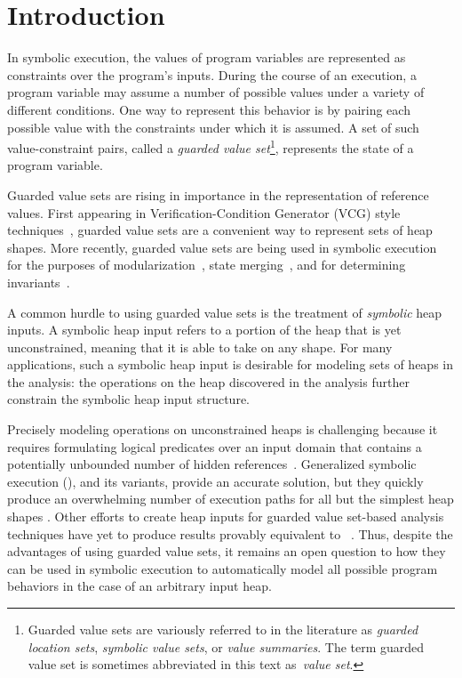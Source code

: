 \section{Introduction}

In symbolic execution, the values of program variables are represented
as constraints over the program's inputs. During the course of an
execution, a program variable may assume a number of possible values
under a variety of different conditions. One way to represent this
behavior is by pairing each possible value with the constraints under
which it is assumed. A set of such value-constraint pairs, called a
\emph{guarded value set}\footnote{Guarded value sets are variously
  referred to in the literature as \emph{guarded location sets},
  \emph{symbolic value sets}, or \emph{value summaries}. The term
  guarded value set is sometimes abbreviated in this text
  as~\emph{value set}.}, represents the state of a program variable.

Guarded value sets are rising in importance in the representation of
reference values. First appearing in Verification-Condition Generator
(VCG) style techniques~\cite{Xie:2005,Dillig:2011}, guarded value sets
are a convenient way to represent sets of heap shapes. More recently,
guarded value sets are being used in symbolic execution for the
purposes of modularization~\cite{Yorsh:2008}, state
merging~\cite{Sen:2014}, and for determining
invariants~\cite{Ferrara:2014,Torlak:2014}.

A common hurdle to using guarded value sets is the treatment of
\emph{symbolic} heap inputs. A symbolic heap input refers to a portion of the heap that is yet unconstrained, meaning that it is able to take on any shape. For many applications, such a symbolic heap input is desirable for modeling sets of heaps in the analysis: the operations on the heap discovered in the analysis further constrain the symbolic heap input
structure.

Precisely modeling operations on unconstrained heaps
is challenging because it requires formulating logical predicates over
an input domain that contains a potentially unbounded number of hidden
references~\cite{Chen:2013,Qu:2011}. Generalized symbolic execution
(\gsetxt{}), and its variants, provide an accurate
solution, but they quickly produce an overwhelming number of execution
paths for all but the simplest heap shapes \cite{GSE03,Deng:2007}. Other efforts to 
create heap inputs for guarded value set-based analysis 
techniques  have yet to
produce results provably equivalent to~\gsetxt{} \cite{Dillig:2011,Xie:2005}. Thus, despite
the advantages of using guarded value sets, it remains an open
question to how they can be used in symbolic execution to automatically
model all possible program behaviors in the case of an arbitrary input
heap.

